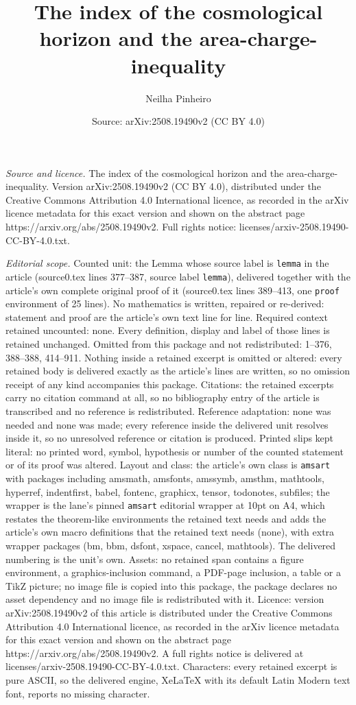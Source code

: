 \documentclass[10pt,a4paper]{amsart}
\title[The index of the cosmological horizon and the area-charge-in]{The index of the cosmological horizon and the area-charge-inequality}
\author{Neilha Pinheiro}
\date{Source: arXiv:2508.19490v2 (CC BY 4.0)}
\begin{document}
\maketitle

\noindent\emph{Source and licence.} The index of the cosmological horizon and the area-charge-inequality. Version arXiv:2508.19490v2 (CC BY 4.0), distributed under the Creative Commons Attribution 4.0 International licence, as recorded in the arXiv licence metadata for this exact version and shown on the abstract page https://arxiv.org/abs/2508.19490v2. Full rights notice: licenses/arxiv-2508.19490-CC-BY-4.0.txt.\par\smallskip

\noindent\textit{Editorial scope.} Counted unit: the Lemma whose source label is \texttt{lemma} in the article (source0.tex lines 377--387, source label \texttt{lemma}), delivered together with the article's own complete original proof of it (source0.tex lines 389--413, one \texttt{proof} environment of 25 lines). No mathematics is written, repaired or re-derived: statement and proof are the article's own text line for line. Required context retained uncounted: none. Every definition, display and label of those lines is retained unchanged. Omitted from this package and not redistributed: 1--376, 388--388, 414--911. Nothing inside a retained excerpt is omitted or altered: every retained body is delivered exactly as the article's lines are written, so no omission receipt of any kind accompanies this package. Citations: the retained excerpts carry no citation command at all, so no bibliography entry of the article is transcribed and no reference is redistributed. Reference adaptation: none was needed and none was made; every reference inside the delivered unit resolves inside it, so no unresolved reference or citation is produced. Printed slips kept literal: no printed word, symbol, hypothesis or number of the counted statement or of its proof was altered. Layout and class: the article's own class is \texttt{amsart} with packages including amsmath, amsfonts, amssymb, amsthm, mathtools, hyperref, indentfirst, babel, fontenc, graphicx, tensor, todonotes, subfiles; the wrapper is the lane's pinned \texttt{amsart} editorial wrapper at 10pt on A4, which restates the theorem-like environments the retained text needs and adds the article's own macro definitions that the retained text needs (none), with extra wrapper packages (bm, bbm, dsfont, xspace, cancel, mathtools). The delivered numbering is the unit's own. Assets: no retained span contains a figure environment, a graphics-inclusion command, a PDF-page inclusion, a table or a TikZ picture; no image file is copied into this package, the package declares no asset dependency and no image file is redistributed with it. Licence: version arXiv:2508.19490v2 of this article is distributed under the Creative Commons Attribution 4.0 International licence, as recorded in the arXiv licence metadata for this exact version and shown on the abstract page https://arxiv.org/abs/2508.19490v2. A full rights notice is delivered at licenses/arxiv-2508.19490-CC-BY-4.0.txt. Characters: every retained excerpt is pure ASCII, so the delivered engine, XeLaTeX with its default Latin Modern text font, reports no missing character.
\end{document}

